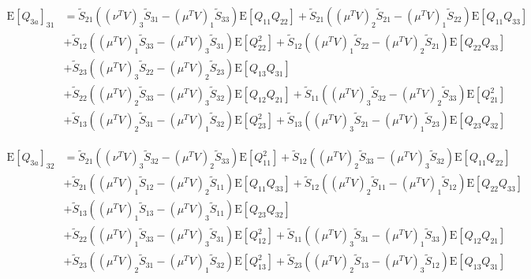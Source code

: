 \documentclass[10pt]{article}
\newcommand{\expect}[1]{\ensuremath{\mathrm{E}\left[ #1 \right]}}
\begin{document}
\begin{align}
	\expect{Q_{3a}}_{31} &= \tilde{S}_{21}\left( (\nu^TV)_3\tilde{S}_{31}-(\mu^TV)_{1}\tilde{S}_{33} \right)\expect{Q_{11}Q_{22}} + \tilde{S}_{21}\left( (\mu^TV)_2\tilde{S}_{21}-(\mu^TV)_1\tilde{S}_{22} \right)\expect{Q_{11}Q_{33}} \nonumber \\
	&+ \tilde{S}_{12}\left( (\mu^TV)_1\tilde{S}_{33}-(\mu^TV)_3\tilde{S}_{31} \right)\expect{Q_{22}^2} + \tilde{S}_{12}\left( (\mu^TV)_1\tilde{S}_{22}-(\mu^TV)_2\tilde{S}_{21} \right)\expect{Q_{22}Q_{33}} \nonumber \\
	&+ \tilde{S}_{23}\left( (\mu^TV)_3\tilde{S}_{22}-(\mu^TV)_2\tilde{S}_{23} \right)\expect{Q_{13}Q_{31}} \nonumber \\
	&+ \tilde{S}_{22}\left( (\mu^TV)_2\tilde{S}_{33}-(\mu^TV)_3\tilde{S}_{32} \right)\expect{Q_{12}Q_{21}} + \tilde{S}_{11}\left( (\mu^TV)_3\tilde{S}_{32}-(\mu^TV)_2\tilde{S}_{33} \right)\expect{Q_{21}^2} \nonumber \\
	&+ \tilde{S}_{13}\left( (\mu^TV)_2\tilde{S}_{31}-(\mu^TV)_1\tilde{S}_{32} \right)\expect{Q_{23}^2} + \tilde{S}_{13}\left( (\mu^TV)_3\tilde{S}_{21}-(\mu^TV)_1\tilde{S}_{23} \right)\expect{Q_{23}Q_{32}}
\end{align}

\begin{align}
	\expect{Q_{3a}}_{32} &= \tilde{S}_{21}\left( (\nu^TV)_3\tilde{S}_{32}-(\mu^TV)_{2}\tilde{S}_{33} \right)\expect{Q_{11}^2} + \tilde{S}_{12}\left( (\mu^TV)_2\tilde{S}_{33}-(\mu^TV)_3\tilde{S}_{32} \right)\expect{Q_{11}Q_{22}} \nonumber \\
	&+ \tilde{S}_{21}\left( (\mu^TV)_1\tilde{S}_{12}-(\mu^TV)_2\tilde{S}_{11} \right)\expect{Q_{11}Q_{33}} + \tilde{S}_{12}\left( (\mu^TV)_2\tilde{S}_{11}-(\mu^TV)_1\tilde{S}_{12} \right)\expect{Q_{22}Q_{33}} \nonumber \\
	&+ \tilde{S}_{13}\left( (\mu^TV)_1\tilde{S}_{13}-(\mu^TV)_3\tilde{S}_{11} \right)\expect{Q_{23}Q_{32}} \nonumber \\
	&+ \tilde{S}_{22}\left( (\mu^TV)_1\tilde{S}_{33}-(\mu^TV)_3\tilde{S}_{31} \right)\expect{Q_{12}^2} + \tilde{S}_{11}\left( (\mu^TV)_3\tilde{S}_{31}-(\mu^TV)_1\tilde{S}_{33} \right)\expect{Q_{12}Q_{21}} \nonumber \\
	&+ \tilde{S}_{23}\left( (\mu^TV)_2\tilde{S}_{31}-(\mu^TV)_1\tilde{S}_{32} \right)\expect{Q_{13}^2} + \tilde{S}_{23}\left( (\mu^TV)_2\tilde{S}_{13}-(\mu^TV)_3\tilde{S}_{12} \right)\expect{Q_{13}Q_{31}}
\end{align}
\end{document}
